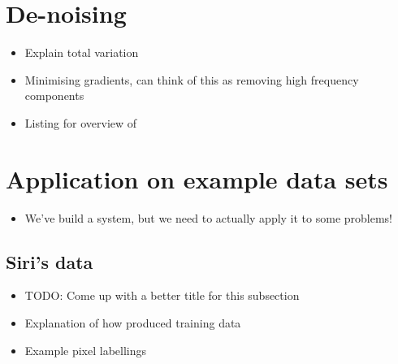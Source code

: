 \documentclass[12pt,twoside,notitlepage]{report}
\begin{document}
    \section{De-noising} \label{sec:de-noising}
        \begin{itemize}
            \item Explain total variation
            \item Minimising gradients, can think of this as removing high frequency components
            \item Listing for overview of 
        \end{itemize}




    \section{Application on example data sets}
        \begin{itemize}
            \item We've build a system, but we need to actually apply it to some problems!
        \end{itemize} 

        \subsection{Siri's data}
            \begin{itemize}
                \item TODO: Come up with a better title for this subsection
                \item Explanation of how produced training data
                \item Example pixel labellings
            \end{itemize}
\end{document}
